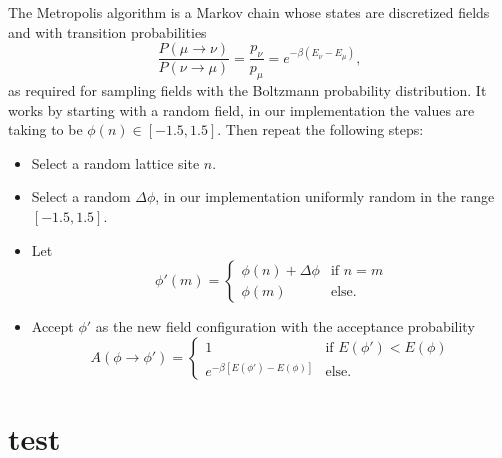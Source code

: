 \documentclass[12pt]{article}
\begin{document}
The Metropolis algorithm is a Markov chain whose states are
discretized fields and with transition probabilities
\begin{equation}
  \frac{P(\mu\to\nu)}{P(\nu\to\mu)}
  = 
  \frac{p_\nu}{p_\mu}
  = 
  e^{-\beta(E_\nu - E_\mu)},
\end{equation}
as required for sampling fields with the Boltzmann probability
distribution. It works by starting with a random field, in our
implementation the values are taking to be $\phi(n) \in [-1.5,
1.5]$. Then repeat the following steps:
\begin{itemize}
\item Select a random lattice site $n$.
\item Select a random $\Delta \phi$, in our implementation uniformly
  random in the range $[-1.5, 1.5]$.
\item Let 
  \begin{equation}
    \phi'(m) =
    \begin{cases}
      \phi(n) + \Delta\phi & \text{if }n = m \\
      \phi(m) & \text{else}.
    \end{cases}
  \end{equation}
\item Accept $\phi'$ as the new field configuration with the
  acceptance probability 
  \begin{equation}
    A(\phi\to\phi') = 
    \begin{cases}
      1 & \text{if } E(\phi') < E(\phi) \\
      e^{-\beta[E(\phi')-E(\phi)]} & \text{else}.
    \end{cases}
  \end{equation}
\end{itemize}







\newpage
\appendix

\section{test}



 
\renewcommand{\refname}{Bibliography}

\end{document}
